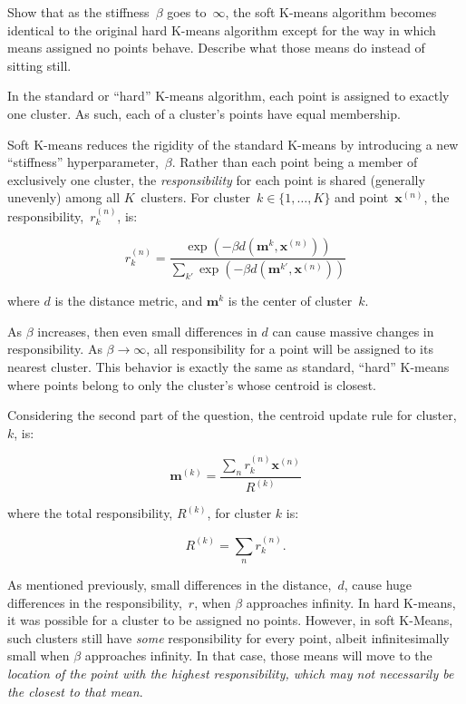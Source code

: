 \newpage
\begin{problem}{20}{2}{2}
  Show that as the stiffness~$\beta$ goes to~$\infty$, the soft K-means algorithm becomes identical to the original hard K-means algorithm except for the way in which means assigned no points behave.  Describe what those means do instead of sitting still.
\end{problem}

In the standard or ``hard'' K-means algorithm, each point is assigned to exactly one cluster.  As such, each of a cluster's points have equal membership.

Soft K-means reduces the rigidity of the standard K-means by introducing a new ``stiffness'' hyperparameter,~$\beta$.  Rather than each point being a member of exclusively one cluster, the \textit{responsibility} for each point is shared (generally unevenly) among all $K$~clusters.  For cluster~$k\in\{1,\ldots,K\}$ and point~$\textbf{x}^{(n)}$, the responsibility,~$r_{k}^{(n)}$, is:

\[ r_{k}^{(n)} = \frac{\exp(-\beta d(\textbf{m}^{k}, \textbf{x}^{(n)}))}{\sum_{k'} \exp(-\beta d(\textbf{m}^{k'}, \textbf{x}^{(n)}))} \]

\noindent
where $d$ is the distance metric, and $\textbf{m}^{k}$ is the center of cluster~$k$.

As $\beta$ increases, then even small differences in $d$ can cause massive changes in responsibility.  As ${\beta \rightarrow \infty}$, all responsibility for a point will be assigned to its nearest cluster.  This behavior is exactly the same as standard, ``hard'' K-means where points belong to only the cluster's whose centroid is closest.

Considering the second part of the question, the centroid update rule for cluster,~$k$, is:

\[ \mathbf{m}^{(k)} = \frac{\sum_{n}r^{(n)}_k \mathbf{x}^{(n)}}{R^{(k)}} \]

\noindent
where the total responsibility, $R^{(k)}$, for cluster $k$ is:

\[ R^{(k)}=\sum_{n} r_{k}^{(n)} \text{.} \]

As mentioned previously, small differences in the distance,~$d$, cause huge differences in the responsibility,~$r$, when $\beta$ approaches infinity.  In hard K-means, it was possible for a cluster to be assigned no points.  However, in soft K-Means, such clusters still have \textit{some} responsibility for every point, albeit infinitesimally small when $\beta$ approaches infinity.  In that case, those means will move to the \textit{location of the point with the highest responsibility, which may not necessarily be the closest to that mean}.

